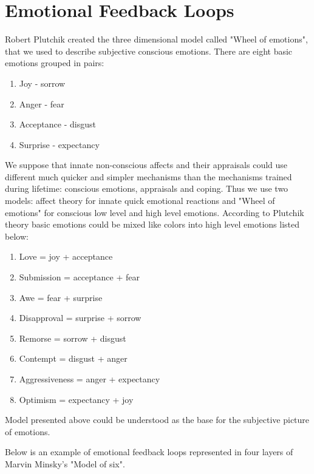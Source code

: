 \section{Emotional Feedback Loops}

Robert Plutchik created the three dimensional model \cite{natureofemotions} called "Wheel of emotions", that we used to describe subjective conscious emotions. There are eight basic emotions grouped in pairs:

\begin{enumerate}
 \item  Joy - sorrow
 \item  Anger - fear
 \item  Acceptance - disgust
 \item  Surprise - expectancy
\end{enumerate}

We suppose that innate non-conscious affects and their appraisals could use different much quicker and simpler mechanisms than the mechanisms trained during lifetime: conscious emotions, appraisals and coping. Thus we use two models: affect theory for innate quick emotional reactions and "Wheel of emotions" for conscious low level and high level emotions. According to Plutchik theory basic emotions could be mixed like colors into high level emotions listed below:

\begin{enumerate}
 \item  Love = joy + acceptance
 \item  Submission = acceptance + fear
 \item  Awe = fear + surprise
 \item  Disapproval = surprise + sorrow
 \item  Remorse = sorrow + disgust
 \item  Contempt = disgust + anger
 \item  Aggressiveness = anger + expectancy
 \item  Optimism = expectancy + joy
\end{enumerate}

Model presented above could be understood as the base for the subjective picture of emotions.

Below is an example of emotional feedback loops \cite{natureofemotions} represented in four layers of Marvin Minsky's "Model of six".

